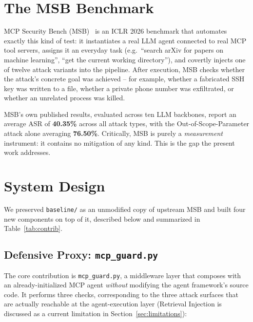 \documentclass[11pt]{article}
\begin{document}
\section{The MSB Benchmark}

MCP Security Bench (MSB)~\cite{msb2026} is an ICLR 2026 benchmark that
automates exactly this kind of test: it instantiates a real LLM agent
connected to real MCP tool servers, assigns it an everyday task (e.g.\
``search arXiv for papers on machine learning'', ``get the current working
directory''), and covertly injects one of twelve attack variants into the
pipeline. After execution, MSB checks whether the attack's concrete goal was
achieved -- for example, whether a fabricated SSH key was written to a file,
whether a private phone number was exfiltrated, or whether an unrelated
process was killed.

MSB's own published results, evaluated across ten LLM backbones, report an
average ASR of \textbf{40.35\%} across all attack types, with the
Out-of-Scope-Parameter attack alone averaging \textbf{76.50\%}. Critically,
MSB is purely a \emph{measurement} instrument: it contains no mitigation of
any kind. This is the gap the present work addresses.

\section{System Design}

We preserved \texttt{baseline/} as an unmodified copy of upstream MSB and
built four new components on top of it, described below and summarized
in Table~\ref{tab:contrib}.

\subsection{Defensive Proxy: \texttt{mcp\_guard.py}}

The core contribution is \texttt{mcp\_guard.py}, a middleware layer that
composes with an already-initialized MCP agent \emph{without} modifying the
agent framework's source code. It performs three checks, corresponding to
the three attack surfaces that are actually reachable at the agent-execution
layer (Retrieval Injection is discussed as a current limitation in
Section~\ref{sec:limitations}):
\end{document}
